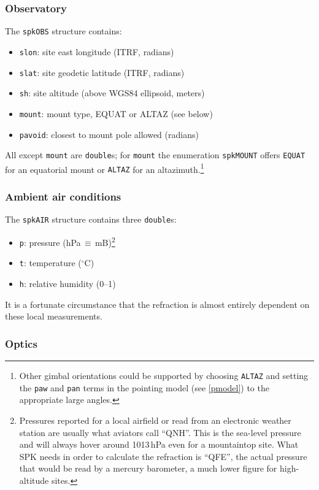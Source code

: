 \documentclass[11pt,fleqn,twoside,\paper]{article}
\renewcommand{\_}{{\tt\char'137}}     %
\begin{document}
\subsubsection{Observatory}
\label{obs}

The {\tt spkOBS} structure contains:
\begin{itemize}
\item {\tt slon}: site east longitude (ITRF, radians)
\item {\tt slat}: site geodetic latitude (ITRF, radians)
\item {\tt sh}: site altitude (above WGS84 ellipsoid, meters)
\item {\tt mount}: mount type, EQUAT or ALTAZ (see below)
\item {\tt pavoid}: closest to mount pole allowed (radians)
\end{itemize}
All except {\tt mount} are {\tt double}s; for {\tt mount} the
enumeration {\tt spkMOUNT} offers {\tt EQUAT} for an equatorial
mount or {\tt ALTAZ} for an altazimuth.\footnote{Other gimbal
orientations could be supported by choosing {\tt ALTAZ} and
setting the {\tt paw} and {\tt pan} terms in the pointing model
(see \ref{pmodel}) to the appropriate large angles.}

\subsubsection{Ambient air conditions}
\label{air}

The {\tt spkAIR} structure contains three {\tt double}s:
\begin{itemize}
\item {\tt p}: pressure (hPa\,$\equiv$\,mB)\footnote{Pressures
reported for a local airfield or read from an electronic weather
station are usually what aviators call ``QNH''.  This is the sea-level
pressure and will always hover around 1013\,hPa even for a
mountaintop site.  What SPK
needs in order to calculate the refraction is ``QFE'', the
actual pressure that would be read by a mercury barometer,
a much lower figure for high-altitude sites.}
\item {\tt t}: temperature ($^\circ$C)
\item {\tt h}: relative humidity (0--1)
\end{itemize}
It is a fortunate circumstance that the refraction is almost
entirely dependent on these local measurements.

\subsubsection{Optics}
\label{optics}
\end{document}

